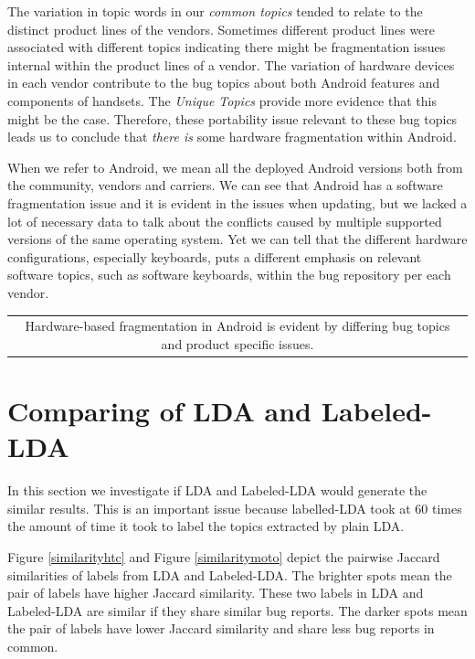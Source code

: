\documentclass[10pt, conference, compsocconf]{IEEEtran}
\begin{document}
The variation in topic words in our \emph{common topics} tended to
relate to the distinct product lines of the vendors. Sometimes
different product lines were associated with different topics
indicating there might be fragmentation issues internal within the
product lines of a vendor.  The variation of hardware devices in each
vendor contribute to the bug topics about both Android features and
components of handsets. The \textit{Unique Topics} provide more
evidence that this might be the case.  Therefore, these portability
issue relevant to these bug topics leads us to conclude that \emph{there is}
some hardware fragmentation within Android.

When we refer to Android, we mean all the deployed Android versions
both from the community, vendors and carriers. We can see that Android
has a software fragmentation issue and it is evident in the issues
when updating, but we lacked a lot of necessary data to talk about the
conflicts caused by multiple supported versions of the same operating
system. Yet we can tell that the different hardware configurations,
especially keyboards, puts a different emphasis on relevant software
topics, such as software keyboards, within the bug repository per each
vendor.

\vspace*{0.5em}
\begin{tabular}{|c|}
\hline 
\parbox{3.0in}{\centering Hardware-based fragmentation in Android is
  evident by differing bug topics and product specific
  issues.}
\\
\hline
\end{tabular}


\section{Comparing of LDA and Labeled-LDA}
\label{sec:comparinglda}

In this section we investigate if LDA and Labeled-LDA would generate
the similar results. This is an important issue because labelled-LDA
took at 60 times the amount of time it took to label the topics
extracted by plain LDA.

Figure \ref{similarityhtc} and Figure \ref{similaritymoto} depict the
pairwise Jaccard similarities of labels from LDA and Labeled-LDA. The
brighter spots mean the pair of labels have higher Jaccard
similarity. These two labels in LDA and Labeled-LDA are similar if
they share similar bug reports. The darker spots mean the pair of
labels have lower Jaccard similarity and share less bug reports in
common. 
\end{document}
